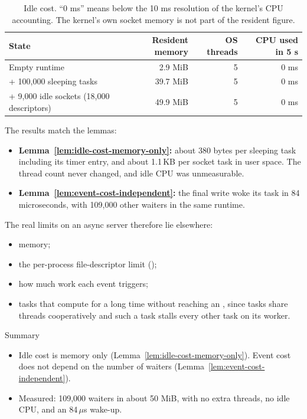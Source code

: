 \begin{table}[htbp]
    \centering\small
    \begin{tabular}{l r r r}
        \toprule
        \textbf{State} & \textbf{Resident memory} & \textbf{OS threads} & \textbf{CPU used in 5 s} \\
        \midrule
        Empty runtime & 2.9 MiB & 5 & 0 ms \\
        + 100,000 sleeping tasks & 39.7 MiB & 5 & 0 ms \\
        + 9,000 idle sockets (18,000 descriptors) & 49.9 MiB & 5 & 0 ms \\
        \bottomrule
    \end{tabular}
    \caption{Idle cost. ``0 ms'' means below the 10 ms resolution of the kernel's CPU accounting. The kernel's own socket memory is not part of the resident figure.}
    \label{tab:wakers-16.1}
\end{table}

The results match the lemmas:

\begin{itemize}
    \item \textbf{Lemma~\ref{lem:idle-cost-memory-only}:} about 380 bytes per sleeping task including its timer entry, and about 1.1\,KB per socket task in user space. The thread count never changed, and idle CPU was unmeasurable.
    \item \textbf{Lemma~\ref{lem:event-cost-independent}:} the final write woke its task in 84 microseconds, with 109,000 other waiters in the same runtime.
\end{itemize}

The real limits on an async server therefore lie elsewhere:

\begin{itemize}
    \item memory;
    \item the per-process file-descriptor limit ();
    \item how much work each event triggers;
    \item tasks that compute for a long time without reaching an , since tasks share threads cooperatively and such a task stalls every other task on its worker.
\end{itemize}

\begin{quotebox}{Summary}
    \begin{itemize}
        \item Idle cost is memory only (Lemma~\ref{lem:idle-cost-memory-only}). Event cost does not depend on the number of waiters (Lemma~\ref{lem:event-cost-independent}).
        \item Measured: 109,000 waiters in about 50 MiB, with no extra threads, no idle CPU, and an 84\,$\mu$s wake-up.
    \end{itemize}
\end{quotebox}


